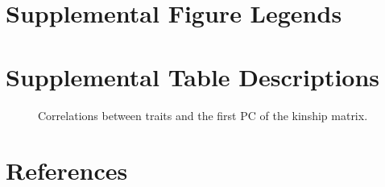 \documentclass[10pt,letterpaper]{article}
\begin{document}
\hypertarget{supplemental-figure-legends}{%
\section{Supplemental Figure
Legends}\label{supplemental-figure-legends}}

\begin{figure}[ht]
\centering
\caption{
}
\label{fig:trait_cor}
\end{figure}

\hypertarget{supplemental-table-descriptions}{%
\section{Supplemental Table
Descriptions}\label{supplemental-table-descriptions}}

\begin{figure}[ht]
\centering
\caption{Correlations between traits and the first PC of the kinship matrix.
}
\label{table:trait_cor}
\end{figure}

\hypertarget{references}{%
\section*{References}\label{references}}

\nolinenumbers
\end{document}
